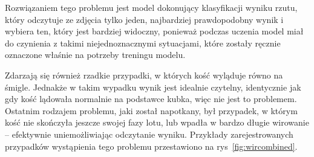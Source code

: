 Rozwiązaniem tego problemu jest model dokonujący klasyfikacji wyniku rzutu, który odczytuje ze zdjęcia tylko jeden, najbardziej prawdopodobny wynik i wybiera ten,
który jest bardziej widoczny, ponieważ podczas uczenia model miał do czynienia z takimi niejednoznacznymi sytuacjami,
które zostały ręcznie oznaczone właśnie na potrzeby treningu modelu.

Zdarzają się również rzadkie przypadki, w których kość wyląduje równo na śmigle.
Jednakże w takim wypadku wynik jest idealnie czytelny,
identycznie jak gdy kość lądowała normalnie na podstawce kubka, więc nie jest to problemem.
Ostatnim rodzajem problemu, jaki został napotkany, był przypadek, w którym kość nie skończyła jeszcze swojej fazy lotu,
lub wpadła w bardzo długie wirowanie -- efektywnie uniemożliwiając odczytanie wyniku.
Przykłady zarejestrowanych przypadków wystąpienia tego problemu przestawiono na rys~\ref{fig:wircombined}.


